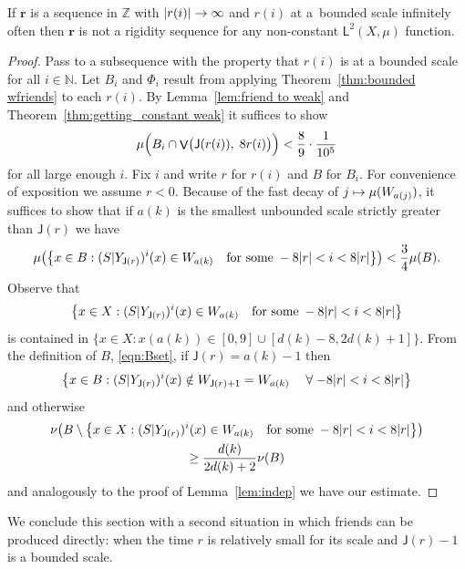 \documentclass[AHL,Unicode,longabstracts,published]{cedram}
\DeclareMathOperator{\bad}{\mathsf{V}}
\newcommand{\N}{\mathbb{N}}
\newcommand{\Z}{\mathbb{Z}}
\newcommand{\lp}{\mathsf{L}}
\newcommand{\scl}{\mathsf{J}}
\newcommand{\bfr}{\mathbf{r}}
\let\originalleft\left
\let\originalright\right
\renewcommand{\left}{\mathopen{}\mathclose\bgroup\originalleft}
\renewcommand{\right}{\aftergroup\egroup\originalright}
\renewcommand*{\to}{\mathchoice{\longrightarrow}{\rightarrow}{\rightarrow}{\rightarrow}}
\let\oldmapsto\mapsto
\renewcommand*{\mapsto}{\mathchoice{\longmapsto}{\oldmapsto}{\oldmapsto}{\oldmapsto}}
\let\oldforall\forall
\renewcommand*{\forall}{\mathrel{\oldforall}}
\begin{document}
\begin{coro}\label{cor:bounded mmix}
If $\bfr$ is a sequence in $\Z$ with $|r(i)| \to \infty$ and $r(i)$ at a~bounded scale infinitely often then $\bfr$ is not a rigidity sequence for any non-constant $\lp^2(X,\mu)$ function.
\end{coro}

\begin{proof}
Pass to a subsequence with the property that $r(i)$ is at a bounded scale for all $i \in \N$. Let $B_i$ and $\Phi_i$ result from applying Theorem~\ref{thm:bounded wfriends} to each $r(i)$. By Lemma~\ref{lem:friend to weak} and Theorem~\ref{thm:getting_constant weak} it suffices to show
\[
\mu\Bigl(B_i \cap \bad\bigl(\scl(r(i)),\;8r(i)\bigr) \Bigr) < \frac{8}{9} \cdot \frac{1}{10^5}
\]
for all large enough $i$. Fix $i$ and write $r$ for $r(i)$ and $B$ for $B_i$. For convenience of exposition we assume $r < 0$. Because of the fast decay of $j \mapsto \mu(W_{a(j)})$, it suffices to show that if $a(k)$ is the smallest unbounded scale strictly greater than $\scl(r)$ we have
\[
\mu\left(\left\{x\in B:(S|Y_{\scl(r)})^i(x)\in W_{a(k)}\quad \text{for some}\; -8|r|<i<8|r|\right\}\right)<\frac 3 4 \mu(B).
\]
Observe that
\[
\left\{x\in X:(S|Y_{\scl(r)})^i(x)\in W_{a(k)} \quad\text{for some}\;-8|r|<i<8|r|\right\}
\]
is contained in $\{x \in X : x(a(k))\in [0,9] \cup [d(k)-8,2d(k)+1] \}$. From the definition of $B$, \eqref{eqn:Bset}, if $\scl(r)=a(k)-1$ then
\[
\left\{x\in B:(S|Y_{\scl(r)})^i(x)\notin W_{\scl(r)+1}=W_{a(k)} \quad\forall -8|r|<i<8|r| \right\}
\]
and otherwise
\begin{multline*}
\nu\left(B \setminus \left\{x\in X:(S|Y_{\scl(r)})^i(x)\in W_{a(k)} \quad\text{for some}\; -8|r|<i<8|r|\right\}\right)\\
\geq \frac{d(k)}{2d(k)+2}\nu(B)
\end{multline*}
and analogously to the proof of Lemma~\ref{lem:indep} we have our estimate.
\end{proof}

We conclude this section with a second situation in which friends can be produced directly: when the time $r$ is relatively small for its scale and $\scl(r) - 1$ is a bounded scale.
\end{document}
